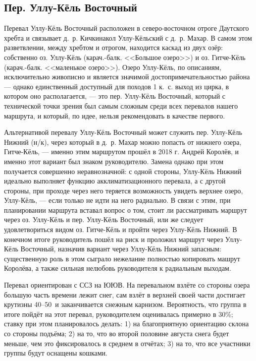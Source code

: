 \subsection{Пер. Уллу-Кёль Восточный} 
Перевал Уллу-Кёль Восточный расположен в северо-восточном отроге Даутского хребта и связывает д.~р. Кичкинакол Уллу-Кёльский с д.~р. Махар. В самом этом разветвлении, между хребтом и отрогом, находится каскад из двух озёр: собственно оз. Уллу-Кёль (карач.-балк. <<Большое озеро>>) и оз. Гитче-Кёль (карач.-балк. <<маленькое озеро>>). Озеро Уллу-Кёль, по описаниям, исключительно живописно и является значимой достопримечательностью района --- однако единственный доступный для походов 1 к.~с. выход из цирка, в котором оно располагается, --- это пер. Уллу-Кёль Восточный, который с технической точки зрения был самым сложным среди всех перевалов нашего маршрута, и который, по идее, нельзя рекомендовать в качестве первого. 

Альтернативой перевалу Уллу-Кёль Восточный может служить пер. Уллу-Кёль Нижний (н/к), через который в д.~р. Махар можно попасть от нижнего озера, Гитче-Кёль, --- именно этим маршрутом прошёл в 2018 г. Андрей Королёв, и именно этот вариант был знаком руководителю. Замена однако при этом получается совершенно неравнозначной: с одной стороны, Уллу-Кёль Нижний идеально выполняет функцию акклиматизационного перевала, а с другой стороны, при проходе через него теряется возможность увидеть верхнее озеро, Уллу-Кёль, --- если только не идти на него радиально. В связи с этим, при планировании маршрута вставал вопрос о том, стоит ли рассматривать маршрут через оз. Уллу-Кёль и пер. Уллу-Кёль Восточный, или же следует удовлетвориться видом оз. Гитче-Кёль и пройти через Уллу-Кёль Нижний. В конечном итоге руководитель пошёл на риск и проложил маршрут через Уллу-Кёль Восточный, назначив вариант через Уллу-Кёль Нижний запасным: существенную роль в этом сыграло нежелание полностью копировать машрут Королёва, а также сильная нелюбовь руководителя к радиальным выходам. 

Перевал ориентирован с ССЗ на ЮЮВ. На перевальном взлёте со стороны озера большую часть времени лежит снег, сам взлёт в верхней своей части достигает крутизны 40--50\degree~и заканчивается снежным карнизом. Вероятность, что группа в итоге пойдёт на этот перевал, руководителем оценивалась примерно в 30\%; ставку при этом планировалось делать: 1) на благоприятную ориентацию склона со стороны подъёма; 2) на то, что во второй половине августа снега будет меньше, чем это фиксировалось в среднем в отчётах; 3) на то, что все участники группы будут оснащены кошками. 